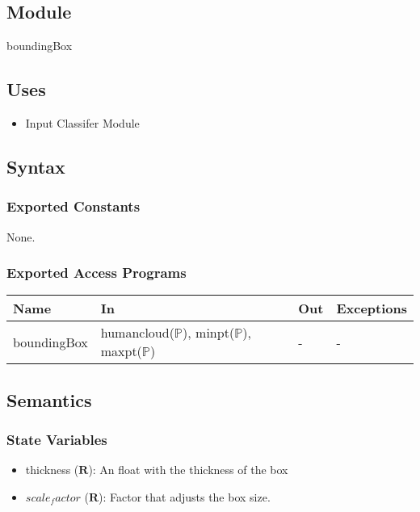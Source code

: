 \documentclass[12pt, titlepage]{article}
\begin{document}
\subsection{Module}

boundingBox

\subsection{Uses}

\begin{itemize}
  \item Input Classifer Module
\end{itemize}

\subsection{Syntax}

\subsubsection{Exported Constants}

None.

\subsubsection{Exported Access Programs}

\begin{center}
\begin{tabular}{p{2cm} p{4cm} p{2cm} p{2cm}}
\hline
\textbf{Name} & \textbf{In} & \textbf{Out} & \textbf{Exceptions} \\
\hline
boundingBox & humancloud($\mathbb{P}$),
              minpt($\mathbb{P}$),
              maxpt($\mathbb{P}$) & - & - \\
\hline
\end{tabular}
\end{center}

\subsection{Semantics}

\subsubsection{State Variables}

\begin{itemize}
  \item thickness ($\mathbf{R}$): An float with the thickness of the box
  \item $scale_factor$ ($\mathbf{R}$): Factor that adjusts the box size.
\end{itemize}
\end{document}
